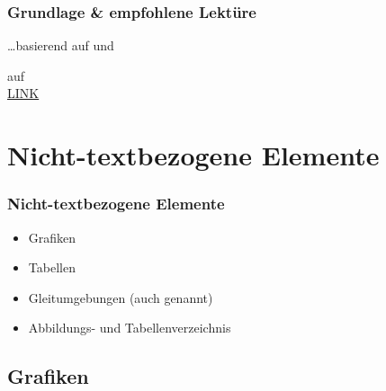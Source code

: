 \begin{frame}
\frametitle{Grundlage \& empfohlene Lektüre}

\dots basierend auf \citet{Freitag&MyP15a} und 

auf \citet{MyP&Kerkhof16a}\\
\ras \href{https://www.researchgate.net/publication/279514740_LATEX-Einfuhrung_fur_Linguisten}{LINK}

\end{frame}


\section{Nicht-textbezogene Elemente}

\begin{frame}
\frametitle{Nicht-textbezogene Elemente}

\begin{itemize}
	\item Grafiken
	
	\item Tabellen
	
	\item Gleitumgebungen (auch  genannt)
	
	\item Abbildungs- und Tabellenverzeichnis	
	
\end{itemize}
\end{frame}


\subsection{Grafiken}

